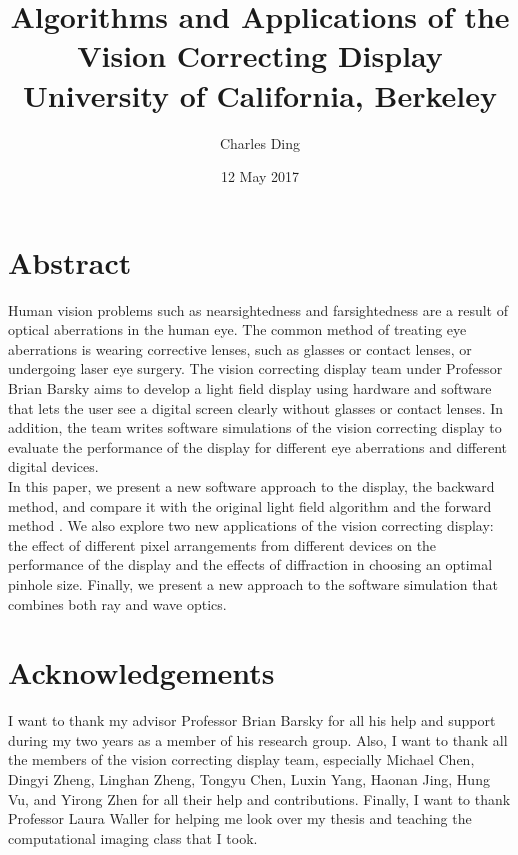 \documentclass[12pt]{report}
\begin{document}
\title{
	{Algorithms and Applications of the Vision Correcting Display}\\
	{\large University of California, Berkeley}\\
}
\author{Charles Ding}
\date{12 May 2017}

\maketitle

\chapter*{Abstract}
Human vision problems such as nearsightedness and farsightedness are a result of optical aberrations in the human eye. The common method of treating eye aberrations is wearing corrective lenses, such as glasses or contact lenses, or undergoing laser eye surgery. The vision correcting display team under Professor Brian Barsky aims to develop a light field display using hardware and software that lets the user see a digital screen clearly without glasses or contact lenses. In addition, the team writes software simulations of the vision correcting display to evaluate the performance of the display for different eye aberrations and different digital devices. \\
In this paper, we present a new software approach to the display, the backward method, and compare it with the original light field algorithm \cite{Huang:EECS-2013-206} and the forward method \cite{Wu:EECS-2016-67}. We also explore two new applications of the vision correcting display: the effect of different pixel arrangements from different devices on the performance of the display and the effects of diffraction in choosing an optimal pinhole size. Finally, we present a new approach to the software simulation that combines both ray and wave optics.

\chapter*{Acknowledgements}
I want to thank my advisor Professor Brian Barsky for all his help and support during my two years as a member of his research group. Also, I want to thank all the members of the vision correcting display team, especially Michael Chen, Dingyi Zheng, Linghan Zheng, Tongyu Chen, Luxin Yang, Haonan Jing, Hung Vu, and Yirong Zhen for all their help and contributions. Finally, I want to thank Professor Laura Waller for helping me look over my thesis and teaching the computational imaging class that I took.
\end{document}
